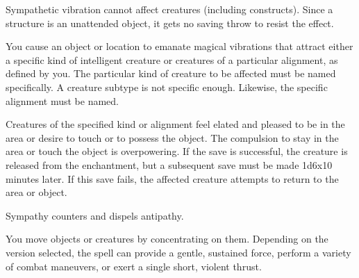 \begin{multicols}{2}
\begin{small}
\smallskip\noindent Sympathetic vibration cannot affect creatures (including constructs). Since a structure is an unattended object, it gets no saving throw to resist the effect.


\noindent You cause an object or location to emanate magical vibrations that attract either a specific kind of intelligent creature or creatures of a particular alignment, as defined by you. The particular kind of creature to be affected must be named specifically. A creature subtype is not specific enough. Likewise, the specific alignment must be named.

\smallskip\noindent Creatures of the specified kind or alignment feel elated and pleased to be in the area or desire to touch or to possess the object. The compulsion to stay in the area or touch the object is overpowering. If the save is successful, the creature is released from the enchantment, but a subsequent save must be made 1d6x10 minutes later. If this save fails, the affected creature attempts to return to the area or object.

\smallskip\noindent Sympathy counters and dispels antipathy.


\noindent You move objects or creatures by concentrating on them. Depending on the version selected, the spell can provide a gentle, sustained force, perform a variety of combat maneuvers, or exert a single short, violent thrust.


\end{small}
\end{multicols}
